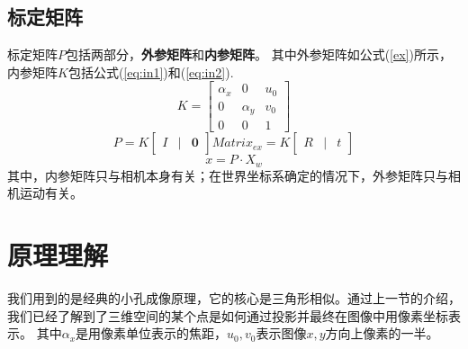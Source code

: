 \documentclass[10pt,a4paper]{article}
\begin{document}
\begin{CJK*}{UTF8}{gbsn}
\subsection{标定矩阵}
标定矩阵$P$包括两部分，\textbf{外参矩阵}和\textbf{内参矩阵}。
其中外参矩阵如公式(\ref{ex})所示，内参矩阵$K$包括公式(\ref{eq:in1})和(\ref{eq:in2}).
\begin{equation}
\label{ww}
K = \begin{bmatrix}
\alpha_x & 0 & u_0 \\
0 & \alpha_y & v_0 \\
0 & 0 & 1
\end{bmatrix}
\end{equation}
\begin{equation}
P = K \begin{bmatrix}  I & | & \mathbf{0}\end{bmatrix} Matrix_{ex} = K \begin{bmatrix}  R&|&t\end{bmatrix}
\end{equation}
\begin{equation}
x = P \cdot X_w
\end{equation}
其中，内参矩阵只与相机本身有关；在世界坐标系确定的情况下，外参矩阵只与相机运动有关。
\section{原理理解}

我们用到的是经典的小孔成像原理，它的核心是三角形相似。通过上一节的介绍，我们已经了解到了三维空间的某个点是如何通过投影并最终在图像中用像素坐标表示。
其中$\alpha_x$是用像素单位表示的焦距，$u_0, v_0$表示图像$x, y$方向上像素的一半。

\end{CJK*}
\end{document}
